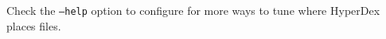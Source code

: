 Check the \texttt{--help} option to configure for more ways to tune where
HyperDex places files.

%
%
%
%
%
%
%
%
%
%
%
